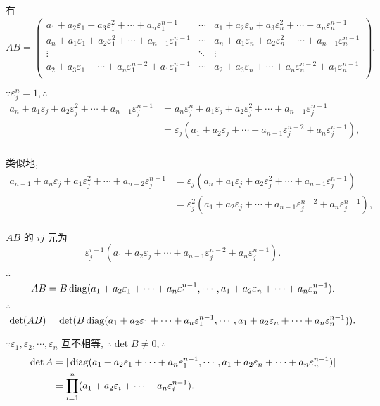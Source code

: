 \documentclass{ctexart}
\begin{document}
\begin{solution}
    有
    \[AB=\begin{pmatrix}
        a_1+a_2\varepsilon_1+a_3\varepsilon_1^2+\cdots+a_n\varepsilon_1^{n-1} & \cdots & a_1+a_2\varepsilon_n+a_3\varepsilon_n^2+\cdots+a_n\varepsilon_n^{n-1} \\
        a_n+a_1\varepsilon_1+a_2\varepsilon_1^2+\cdots+a_{n-1}\varepsilon_1^{n-1} & \cdots & a_n+a_1\varepsilon_n+a_2\varepsilon_n^2+\cdots+a_{n-1}\varepsilon_n^{n-1} \\
        \vdots & \ddots & \vdots \\
        a_2+a_3\varepsilon_1+\cdots+a_n\varepsilon_1^{n-2}+a_1\varepsilon_1^{n-1} & \cdots & a_2+a_3\varepsilon_n+\cdots+a_n\varepsilon_n^{n-2}+a_1\varepsilon_n^{n-1} \\
    \end{pmatrix}.\]

    $\because\varepsilon_j^n=1,\therefore$
    \begin{align*}
        a_n+a_1\varepsilon_j+a_2\varepsilon_j^2+\cdots+a_{n-1}\varepsilon_j^{n-1} & =a_n\varepsilon_j^n+a_1\varepsilon_j+a_2\varepsilon_j^2+\cdots+a_{n-1}\varepsilon_j^{n-1} \\
        & =\varepsilon_j(a_1+a_2\varepsilon_j+\cdots+a_{n-1}\varepsilon_j^{n-2}+a_n\varepsilon_j^{n-1}), \\
    \end{align*}

    类似地,
    \begin{align*}
        a_{n-1}+a_n\varepsilon_j+a_1\varepsilon_j^2+\cdots+a_{n-2}\varepsilon_j^{n-1} & =\varepsilon_j(a_n+a_1\varepsilon_j+a_2\varepsilon_j^2+\cdots+a_{n-1}\varepsilon_j^{n-1}) \\
        & =\varepsilon_j^2(a_1+a_2\varepsilon_j+\cdots+a_{n-1}\varepsilon_j^{n-2}+a_n\varepsilon_j^{n-1}), \\
    \end{align*}

    $AB$ 的 $ij$ 元为
    \[\varepsilon_j^{i-1}(a_1+a_2\varepsilon_j+\cdots+a_{n-1}\varepsilon_j^{n-2}+a_n\varepsilon_j^{n-1}).\]

    $\therefore$
    \[AB=B\operatorname{diag} (a_1+a_2\varepsilon_1+\cdots+a_n\varepsilon_1^{n-1},\cdots,a_1+a_2\varepsilon_n+\cdots+a_n\varepsilon_n^{n-1}).\]

    $\therefore$
    \[\det(AB)=\det(B\operatorname{diag} (a_1+a_2\varepsilon_1+\cdots+a_n\varepsilon_1^{n-1},\cdots,a_1+a_2\varepsilon_n+\cdots+a_n\varepsilon_n^{n-1})).\]

    $\because\varepsilon_1,\varepsilon_2,\cdots,\varepsilon_n$ 互不相等, $\therefore\det B\neq0,\therefore$
    \begin{align*}
        \det A & =|\operatorname{diag} (a_1+a_2\varepsilon_1+\cdots+a_n\varepsilon_1^{n-1},\cdots,a_1+a_2\varepsilon_n+\cdots+a_n\varepsilon_n^{n-1})| \\
        & =\prod\limits_{i=1}^n(a_1+a_2\varepsilon_i+\cdots+a_n\varepsilon_i^{n-1}). \\
    \end{align*}
\end{solution}
\end{document}
